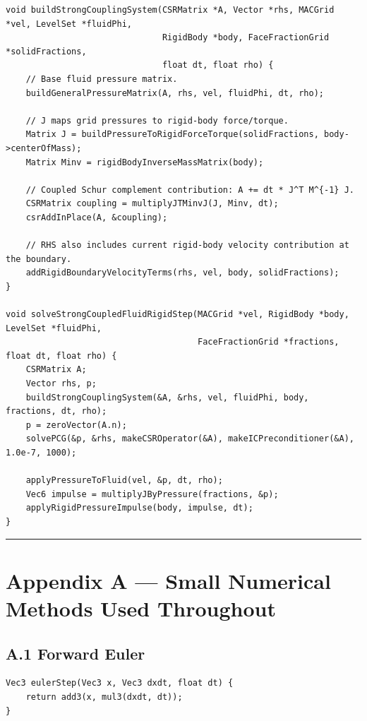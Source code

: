 \documentclass[10pt,letterpaper]{article}
\begin{document}
\begin{verbatim}
void buildStrongCouplingSystem(CSRMatrix *A, Vector *rhs, MACGrid *vel, LevelSet *fluidPhi,
                               RigidBody *body, FaceFractionGrid *solidFractions,
                               float dt, float rho) {
    // Base fluid pressure matrix.
    buildGeneralPressureMatrix(A, rhs, vel, fluidPhi, dt, rho);

    // J maps grid pressures to rigid-body force/torque.
    Matrix J = buildPressureToRigidForceTorque(solidFractions, body->centerOfMass);
    Matrix Minv = rigidBodyInverseMassMatrix(body);

    // Coupled Schur complement contribution: A += dt * J^T M^{-1} J.
    CSRMatrix coupling = multiplyJTMinvJ(J, Minv, dt);
    csrAddInPlace(A, &coupling);

    // RHS also includes current rigid-body velocity contribution at the boundary.
    addRigidBoundaryVelocityTerms(rhs, vel, body, solidFractions);
}

void solveStrongCoupledFluidRigidStep(MACGrid *vel, RigidBody *body, LevelSet *fluidPhi,
                                      FaceFractionGrid *fractions, float dt, float rho) {
    CSRMatrix A;
    Vector rhs, p;
    buildStrongCouplingSystem(&A, &rhs, vel, fluidPhi, body, fractions, dt, rho);
    p = zeroVector(A.n);
    solvePCG(&p, &rhs, makeCSROperator(&A), makeICPreconditioner(&A), 1.0e-7, 1000);

    applyPressureToFluid(vel, &p, dt, rho);
    Vec6 impulse = multiplyJByPressure(fractions, &p);
    applyRigidPressureImpulse(body, impulse, dt);
}
\end{verbatim}

\medskip\hrule\medskip

\clearpage
{}
\section*{Appendix A --- Small Numerical Methods Used Throughout}

\subsection*{A.1 Forward Euler}

\begin{verbatim}
Vec3 eulerStep(Vec3 x, Vec3 dxdt, float dt) {
    return add3(x, mul3(dxdt, dt));
}
\end{verbatim}
\end{document}

